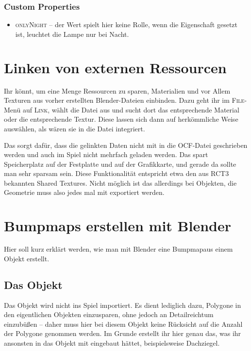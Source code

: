 \documentclass[a4paper]{article}
\newcommand{\ccaption}[1]{\textsc{#1}}
\begin{document}
\subsubsection{Custom Properties}
\begin{itemize}
\item \ccaption{onlyNight} -- der Wert spielt hier keine Rolle, wenn die Eigenschaft gesetzt ist, leuchtet die Lampe nur bei Nacht.
\end{itemize}

\section{Linken von externen Ressourcen}
Ihr könnt, um eine Menge Ressourcen zu sparen, Materialien und vor Allem Texturen aus vorher erstellten Blender-Dateien einbinden. Dazu geht ihr
im \ccaption{File}-Menü auf \ccaption{Link}, wählt die Datei aus und sucht dort das entsprechende Material oder die entsprechende Textur. Diese lassen
sich dann auf herkömmliche Weise auswählen, als wären sie in die Datei integriert.

Das sorgt dafür, dass die gelinkten Daten nicht mit in die OCF-Datei geschrieben werden und auch im Spiel nicht mehrfach geladen werden. Das spart
Speicherplatz auf der Festplatte und auf der Grafikkarte, und gerade da sollte man sehr sparsam sein. Diese Funktionalität entspricht etwa
den aus RCT3 bekannten Shared Textures. Nicht möglich ist das allerdings bei Objekten, die Geometrie muss also jedes mal mit exportiert werden.

\section{Bumpmaps erstellen mit Blender}
\label{bumpmaps}
Hier soll kurz erklärt werden, wie man mit Blender eine Bumpmapaus einem Objekt erstellt.

\subsection{Das Objekt}
Das Objekt wird nicht ins Spiel importiert. Es dient lediglich dazu, Polygone in den eigentlichen Objekten einzusparen, ohne jedoch an Detailreichtum
einzubüßen -- daher muss hier bei diesem Objekt keine Rücksicht auf die Anzahl der Polygone genommen werden. Im Grunde erstellt ihr hier genau das, was
ihr ansonsten in das Objekt mit eingebaut hättet, beispielsweise Dachziegel.
\end{document}
